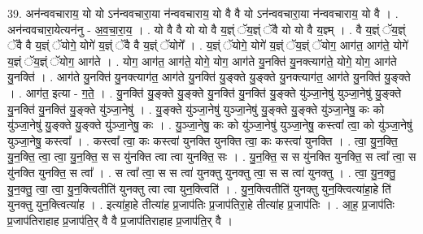 \documentclass[17pt]{extarticle}
\begin{document}
39. अन॑न्ववचाराय॒ यो यो ऽन॑न्ववचारा॒या न॑न्ववचाराय॒ यो वै वै यो ऽन॑न्ववचारा॒या न॑न्ववचाराय॒ यो वै । . अन॑न्ववचारा॒येत्यन॑नु - अ॒व॒चा॒रा॒य॒ । . यो वै वै यो यो वै य॒ज्ञ्ं ॅय॒ज्ञ्ं ॅवै यो यो वै य॒ज्ञ्म् । . वै य॒ज्ञ्ं ॅय॒ज्ञ्ं ॅवै वै य॒ज्ञ्ं ॅयोगे॒ योगे॑ य॒ज्ञ्ं ॅवै वै य॒ज्ञ्ं ॅयोगे᳚ । . य॒ज्ञ्ं ॅयोगे॒ योगे॑ य॒ज्ञ्ं ॅय॒ज्ञ्ं ॅयोग॒ आग॑त॒ आग॑ते॒ योगे॑ य॒ज्ञ्ं ॅय॒ज्ञ्ं ॅयोग॒ आग॑ते । . योग॒ आग॑त॒ आग॑ते॒ योगे॒ योग॒ आग॑ते यु॒नक्ति॑ यु॒नक्त्याग॑ते॒ योगे॒ योग॒ आग॑ते यु॒नक्ति॑ । . आग॑ते यु॒नक्ति॑ यु॒नक्त्याग॑त॒ आग॑ते यु॒नक्ति॑ यु॒ङ्क्ते यु॒ङ्क्ते यु॒नक्त्याग॑त॒ आग॑ते यु॒नक्ति॑ यु॒ङ्क्ते । . आग॑त॒ इत्या - ग॒ते॒ । . यु॒नक्ति॑ यु॒ङ्क्ते यु॒ङ्क्ते यु॒नक्ति॑ यु॒नक्ति॑ यु॒ङ्क्ते यु॑ञ्जा॒नेषु॑ युञ्जा॒नेषु॑ यु॒ङ्क्ते यु॒नक्ति॑ यु॒नक्ति॑ यु॒ङ्क्ते यु॑ञ्जा॒नेषु॑ । . यु॒ङ्क्ते यु॑ञ्जा॒नेषु॑ युञ्जा॒नेषु॑ यु॒ङ्क्ते यु॒ङ्क्ते यु॑ञ्जा॒नेषु॒ कः को यु॑ञ्जा॒नेषु॑ यु॒ङ्क्ते यु॒ङ्क्ते यु॑ञ्जा॒नेषु॒ कः । . यु॒ञ्जा॒नेषु॒ कः को यु॑ञ्जा॒नेषु॑ युञ्जा॒नेषु॒ कस्त्वा᳚ त्वा॒ को यु॑ञ्जा॒नेषु॑ युञ्जा॒नेषु॒ कस्त्वा᳚ । . कस्त्वा᳚ त्वा॒ कः कस्त्वा॑ युनक्ति युनक्ति त्वा॒ कः कस्त्वा॑ युनक्ति । . त्वा॒ यु॒न॒क्ति॒ यु॒न॒क्ति॒ त्वा॒ त्वा॒ यु॒न॒क्ति॒ स स यु॑नक्ति त्वा त्वा युनक्ति॒ सः । . यु॒न॒क्ति॒ स स यु॑नक्ति युनक्ति॒ स त्वा᳚ त्वा॒ स यु॑नक्ति युनक्ति॒ स त्वा᳚ । . स त्वा᳚ त्वा॒ स स त्वा॑ युनक्तु युनक्तु त्वा॒ स स त्वा॑ युनक्तु । . त्वा॒ यु॒न॒क्तु॒ यु॒न॒क्तु॒ त्वा॒ त्वा॒ यु॒न॒क्त्वितीति॑ युनक्तु त्वा त्वा युन॒क्त्विति॑ । . यु॒न॒क्त्वितीति॑ युनक्तु युन॒क्त्वित्या॑हा॒हे ति॑ युनक्तु युन॒क्त्वित्या॑ह । . इत्या॑हा॒हे तीत्या॑ह प्र॒जाप॑तिः प्र॒जाप॑तिरा॒हे तीत्या॑ह प्र॒जाप॑तिः । . आ॒ह॒ प्र॒जाप॑तिः प्र॒जाप॑तिराहाह प्र॒जाप॑ति॒र् वै वै प्र॒जाप॑तिराहाह प्र॒जाप॑ति॒र् वै । \newline
\end{document}
